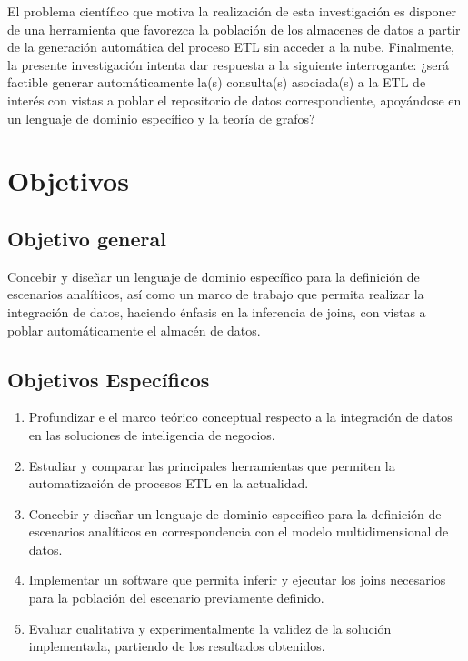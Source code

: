 El problema científico que motiva la realización de esta investigación es disponer de una herramienta que 
favorezca la población de los almacenes de datos a partir de la generación automática del proceso ETL sin 
acceder a la nube. Finalmente, la presente investigación intenta dar respuesta a la siguiente interrogante: 
¿será factible generar 
automáticamente la(s) consulta(s) asociada(s) a la ETL de interés con vistas a poblar el repositorio de datos 
correspondiente, apoy\'andose en un lenguaje de dominio espec\'ifico y la teor\'ia de grafos?

\section{Objetivos}

\subsection{Objetivo general}

Concebir y diseñar un lenguaje de dominio específico para la definici\'on de escenarios analíticos, as\'i como un marco 
de trabajo que permita realizar la integración de datos, haciendo énfasis en la inferencia de joins, 
con vistas a poblar automáticamente el almacén de datos.

\subsection{Objetivos Espec\'ificos}

\begin{enumerate}
    \item Profundizar e el marco te\'orico conceptual respecto a la integración de datos en las soluciones de 
        inteligencia de negocios.  
    \item Estudiar y comparar las principales herramientas que permiten la automatización de procesos ETL en la actualidad.
    \item Concebir y diseñar un lenguaje de dominio específico para la definici\'on de escenarios analíticos en 
        correspondencia con el modelo multidimensional de datos.
    \item Implementar un software que permita inferir y ejecutar los joins necesarios para la población del escenario 
        previamente definido.
    \item Evaluar cualitativa y experimentalmente la validez de la solución implementada, partiendo de los resultados 
        obtenidos.
\end{enumerate}


